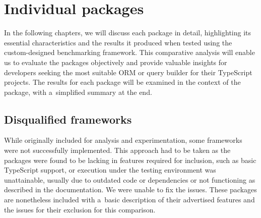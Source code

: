 \chapter{Individual packages}\label{ch:Packages}

In the following chapters, we will discuss each package in detail, highlighting
its essential characteristics and the results it produced when tested using the
custom-designed benchmarking framework. This comparative analysis will enable us
to evaluate the packages objectively and provide valuable insights for
developers seeking the most suitable ORM or query builder for their TypeScript
projects. The results for each package will be examined in the context of the
package, with a~simplified summary at the end.











\section{Disqualified frameworks}
\label{sec:disqualified}

While originally included for analysis and experimentation, some frameworks were
not successfully implemented. This approach had to be taken as the packages were
found to be lacking in features required for inclusion, such as basic TypeScript
support, or execution under the testing environment was unattainable, usually
due to outdated code or dependencies or not functioning as described in the
documentation. We were unable to fix the issues. These packages are nonetheless
included with a~basic description of their advertised features and the issues
for their exclusion for this comparison.



